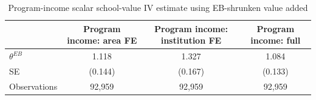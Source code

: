 \begin{table}[!htbp]
\centering
\caption{Program-income scalar school-value IV estimate using EB-shrunken value added}
\label{tab:scalar_school_value_iv_program_income_expected_va_eb}
\begin{tabular}{lccc}
\toprule
 & Program income: area FE & Program income: institution FE & Program income: full \\
\midrule
$\theta^{EB}$ & 1.118 & 1.327 & 1.084 \\
SE & (0.144) & (0.167) & (0.133) \\
Observations & 92,959 & 92,959 & 92,959 \\
\bottomrule
\end{tabular}
\end{table}
